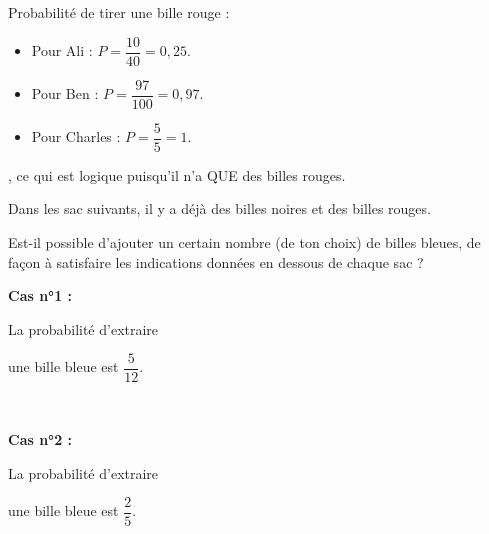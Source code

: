 \begin{Maquette}[Fiche,CorrigeFin,Colonnes=2]{}
\begin{multicols}{2}
      \begin{Solution}
         Probabilité de tirer une bille rouge :
         \begin{itemize}
            \item Pour Ali : $P =\dfrac{10}{40} =0,25$. \smallskip
            \item Pour Ben : $P =\dfrac{97}{100} =0,97$. \smallskip
            \item Pour Charles : $P =\dfrac{5}{5} =1$. \smallskip
         \end{itemize}
         , ce qui est logique puisqu'il n'a QUE des billes rouges.
      \end{Solution}
      
      
      \begin{exercice}[Dur] %
         Dans les sac suivants, il y a déjà des billes noires et des billes rouges. \par
         Est-il possible d’ajouter un certain nombre (de ton choix) de billes bleues, de façon à satisfaire les indications données en dessous de chaque sac ? \par \smallskip
         \begin{minipage}{2.5cm} %
         \end{minipage}
         \begin{minipage}{5.3cm}
            {\bf Cas n°1 :} \par
            La probabilité d'extraire \par
            une bille bleue est $\dfrac{5}{12}$.
         \end{minipage} \\
         \begin{minipage}{2.5cm} %
         \end{minipage}
         \begin{minipage}{5.3cm}
            {\bf Cas n°2 :} \par
            La probabilité d'extraire \par
            une bille bleue est $\dfrac{2}{5}$.
         \end{minipage} \\
         \begin{minipage}{2.5cm} %

\end{minipage}
\end{exercice}
\end{multicols}
\end{Maquette}
